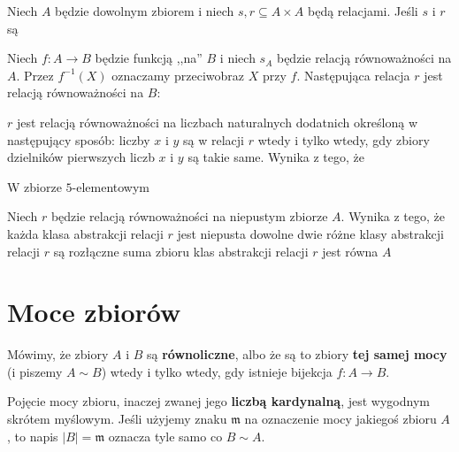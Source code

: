 \begin{problems}
    \prob Niech $A$ będzie dowolnym zbiorem i niech $s,r\subseteq A\times A$ będą relacjami. Jeśli $s$ i $r$ są

    \prob Niech $f:A\rightarrow B$ będzie funkcją ,,na'' $B$ i niech $s_A$ będzie relacją równoważności na $A$. Przez $f^{-1}(X)$ oznaczamy przeciwobraz $X$ przy $f$. Następująca relacja $r$ jest relacją równoważności na $B$:

    \prob $r$ jest relacją równoważności na liczbach naturalnych dodatnich określoną w następujący sposób: liczby $x$ i $y$ są w relacji $r$ wtedy i tylko wtedy, gdy zbiory dzielników pierwszych liczb $x$ i $y$ są takie same. Wynika z tego, że

    \prob W zbiorze $5$-elementowym

    \prob Niech $r$ będzie relacją równoważności na niepustym zbiorze $A$. Wynika z tego, że
    \answers
    {każda klasa abstrakcji relacji $r$ jest niepusta}
    {dowolne dwie różne klasy abstrakcji relacji $r$ są rozłączne}
    {suma zbioru klas abstrakcji relacji $r$ jest równa $A$}
\end{problems}

\section{Moce zbiorów}
Mówimy, że zbiory $A$ i $B$ są \textbf{równoliczne}, albo że są to zbiory \textbf{tej samej mocy} (i piszemy $A \sim B$) wtedy i tylko wtedy, gdy istnieje bijekcja $f : A \to B$.

Pojęcie mocy zbioru, inaczej zwanej jego \textbf{liczbą kardynalną}, jest wygodnym skrótem myślowym. Jeśli użyjemy znaku $\mathfrak{m}$ na oznaczenie mocy jakiegoś zbioru $A$, to napis $|B| = \mathfrak{m}$ oznacza tyle samo co $B \sim A$.

